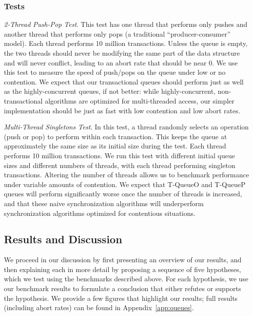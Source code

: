 \subsubsection{Tests}
    \emph{2-Thread Push-Pop Test}. This test has one thread that performs only pushes and another thread that performs only pops (a traditional ``producer-consumer'' model). Each thread performs 10 million transactions. Unless the queue is empty, the two threads should never be modifying the same part of the data structure and will never conflict, leading to an abort rate that should be near 0. We use this test to measure the speed of push/pops on the queue under low or no contention. We expect that our transactional queues should perform just as well as the highly-concurrent queues, if not better: while highly-concurrent, non-transactional algorithms are optimized for multi-threaded access, our simpler implementation should be just as fast with low contention and low abort rates.

\emph{Multi-Thread Singletons Test}.
    In this test, a thread randomly selects an operation (push or pop) to perform within each transaction. This keeps the queue at approximately the same size as its initial size during the test. Each thread performs 10 million transactions. We run this test with different initial queue sizes and different numbers of threads, with each thread performing singleton transactions. Altering the number of threads allows us to benchmark performance under variable amounts of contention. We expect that T-QueueO and T-QueueP queues will perform significantly worse once the number of threads is increased, and that these naive synchronization algorithms will underperform synchronization algorithms optimized for contentious situations.

\subsection{Results and Discussion}

We proceed in our discussion by first presenting an overview of our results, and then explaining each in more detail by proposing a sequence of five hypotheses, which we test using the benchmarks described above. For each hypothesis, we use our benchmark results to formulate a conclusion that either refutes or supports the hypothesis.
We provide a few figures that highlight our results; full results (including abort rates) can be found in Appendix~\ref{app:queues}. 

